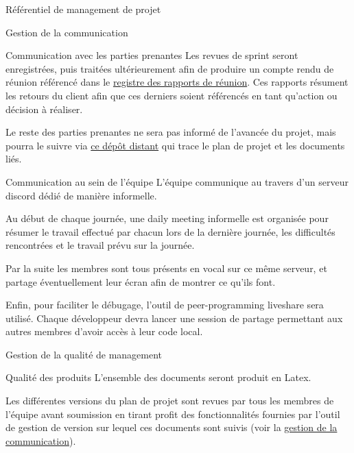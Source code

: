 \documentclass[]{article}
\begin{document}
{\begin{section}{\label{sec:Référentiel de management de projet}Référentiel de management de projet}
\begin{subsection}{\label{sec:Gestion de la communication}Gestion de la communication}
\begin{subsubsection}{\label{sec:Communication avec les parties prenantes}Communication avec les parties prenantes}
             Les revues de sprint seront enregistrées, puis traitées ultérieurement afin de produire un compte rendu de réunion référencé dans le \href{documents/Registre_des_rapports_de_réunion.pdf}{registre des rapports de réunion}. Ces rapports résument les retours du client afin que ces derniers soient référencés en tant qu’action ou décision à réaliser.

             Le reste des parties prenantes ne sera pas informé de l’avancée du projet, mais pourra le suivre via \href{https://github.com/Szyckaa/UE-PROJET-DOCS-GESTION}{ce dépôt distant} qui trace le plan de projet et les documents liés.
         \end{subsubsection}

         \newpage

         \begin{subsubsection}{\label{sec:Communication au sein de l'équipe}Communication au sein de l'équipe}
             L’équipe communique au travers d’un serveur discord dédié de manière informelle.

             Au début de chaque journée, une daily meeting informelle est organisée pour résumer le travail effectué par chacun lors de la dernière journée, les difficultés rencontrées et le travail prévu sur la journée.

             Par la suite les membres sont tous présents en vocal sur ce même serveur, et partage éventuellement leur écran afin de montrer ce qu’ils font.

             Enfin, pour faciliter le débugage, l’outil de peer-programming liveshare sera utilisé. Chaque développeur devra lancer une session de partage permettant aux autres membres d’avoir accès à leur code local.
         \end{subsubsection}
     \end{subsection}

     \begin{subsection}{\label{sec:Gestion de la qualité de management}Gestion de la qualité de management}
         \begin{subsubsection}{\label{sec:Qualité des produits}Qualité des produits}
            L'ensemble des documents seront produit en Latex.

             Les différentes versions du plan de projet sont revues par tous les membres de l’équipe avant soumission en tirant profit des fonctionnalités fournies par l'outil de gestion de version sur lequel ces documents sont suivis (voir la \hyperref[sec:Communication avec les parties prenantes]{gestion de la communication}).


\end{subsubsection}
\end{subsection}
\end{section}}
\end{document}
